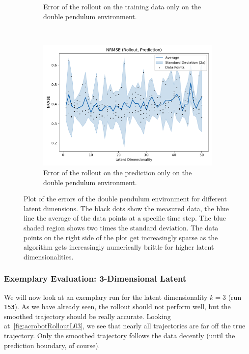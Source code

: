 \begin{figure}
\begin{subfigure}{0.5\linewidth}
					\caption[Error of the training rollout on the double pendulum environment]{Error of the rollout on the training data only on the double pendulum environment.}
					\label{fig:acrobotRmseTrain}
				\end{subfigure}%
				~
				\begin{subfigure}{0.5\linewidth}
					\centering
					\includegraphics[width=\linewidth]{figures/results/acrobot-gym/latent-dim/comparison-rmse-rollout-prediction-normalized-mean-vs-latent-dim.pdf}
					\caption[Error of the prediction rollout on the double pendulum environment]{Error of the rollout on the prediction only on the double pendulum environment.}
					\label{fig:acrobotRmsePred}
				\end{subfigure}
				\caption[Errors on the double pendulum environment for different latent dimensions]{Plot of the errors of the double pendulum environment for different latent dimensions. The black dots show the measured data, the blue line the average of the data points at a specific time step. The blue shaded region shows two times the standard deviation. The data points on the right side of the plot get increasingly sparse as the algorithm gets increasingly numerically brittle for higher latent dimensionalities.}
				\label{fig:acrobotRmse}
			\end{figure}

		\subsubsection{Exemplary Evaluation: 3-Dimensional Latent}
			We will now look at an exemplary run for the latent dimensionality \( k = 3 \) (run \texttt{153}). As we have already seen, the rollout should not perform well, but the smoothed trajectory should be really accurate. Looking at~\autoref{fig:acrobotRolloutL03}, we see that nearly all trajectories are far off the true trajectory. Only the smoothed trajectory follows the data decently (until the prediction boundary, of course).

